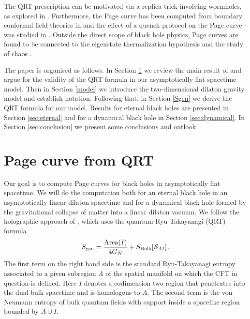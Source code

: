 \documentclass[12pt,a4paper]{article}
\newcommand{\be}{\begin{equation}}
\newcommand{\ee}{\end{equation}}
\newcommand{\f}[2]{\frac{#1}{#2}}
\begin{document}
The QRT prescription can be motivated via a replica trick involving wormholes, as explored in \cite{Almheiri:2019qdq,Penington:2019kki,Akers:2019nfi,Balasubramanian:2020hfs,Bhattacharya:2020ymw}. Furthermore, the Page curve has been computed from boundary conformal field theories in \cite{Rozali:2019day} and the effect of a quench protocol on the Page curve was studied in \cite{Chen:2019uhq}. Outside the direct scope of black hole physics, Page curves are found to be connected to the eigenstate thermalization hypothesis \cite{Pollack:2020gfa} and the study of chaos \cite{Liu:2020gnp}. 

The paper is organised as follows. In Section \ref{sec:qrt} we review the main result of \cite{Penington:2019npb,Rocha:2008fe,Almheiri:2019hni} and argue for the validity of the QRT formula in our asymptotically flat spacetime model. Then in Section \ref{model} we introduce the two-dimensional dilaton gravity model and establish notation. Following that, in Section \ref{Sgen} we derive the QRT formula for our model. Results for eternal black holes are presented in Section \ref{sec:eternal} and for a dynamical black hole in Section \ref{sec:dynamical}. In Section \ref{sec:conclusion} we present some conclusions and outlook.

%
\section{Page curve from QRT}\label{sec:qrt}
%
Our goal is to compute Page curves for black holes in asymptotically flat spacetime.   We will do the computation both for an eternal black hole in an asymptotically linear dilaton spacetime and for a dynamical black hole formed by the gravitational collapse of matter into a linear dilaton vacuum. 
We follow the holographic approach of \cite{Penington:2019npb,Almheiri:2019psf}, which uses the quantum Ryu-Takayanagi (QRT) formula
\be\label{Sgendef}
S_\text{gen} = \f{\text{Area}(I)}{4G_N} + S_\text{Bulk}[{\cal S}_{AI}] \,.
\ee
The first term on the right hand side is the standard Ryu-Takayanagi entropy associated to a given subregion $A$ of the spatial manifold on which the CFT in question is defined. Here $I$ denotes a codimension two region that penetrates into the dual bulk spacetime and is homologous to $A$. The second term is the von Neumann entropy of bulk quantum fields with support inside a spacelike region bounded by $A\cup I$.
\end{document}
